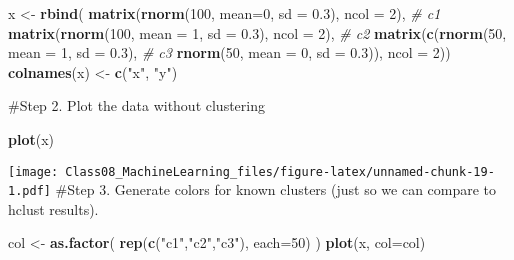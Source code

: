 \documentclass[]{article}
\newenvironment{Shaded}{\begin{snugshade}}{\end{snugshade}}
\newcommand{\CommentTok}[1]{\textcolor[rgb]{0.56,0.35,0.01}{\textit{#1}}}
\newcommand{\DataTypeTok}[1]{\textcolor[rgb]{0.13,0.29,0.53}{#1}}
\newcommand{\DecValTok}[1]{\textcolor[rgb]{0.00,0.00,0.81}{#1}}
\newcommand{\FloatTok}[1]{\textcolor[rgb]{0.00,0.00,0.81}{#1}}
\newcommand{\KeywordTok}[1]{\textcolor[rgb]{0.13,0.29,0.53}{\textbf{#1}}}
\newcommand{\NormalTok}[1]{#1}
\newcommand{\StringTok}[1]{\textcolor[rgb]{0.31,0.60,0.02}{#1}}
\begin{document}
\begin{Shaded}
\begin{Highlighting}[]
\NormalTok{x <-}\StringTok{ }\KeywordTok{rbind}\NormalTok{(}
 \KeywordTok{matrix}\NormalTok{(}\KeywordTok{rnorm}\NormalTok{(}\DecValTok{100}\NormalTok{, }\DataTypeTok{mean=}\DecValTok{0}\NormalTok{, }\DataTypeTok{sd =} \FloatTok{0.3}\NormalTok{), }\DataTypeTok{ncol =} \DecValTok{2}\NormalTok{), }\CommentTok{# c1}
 \KeywordTok{matrix}\NormalTok{(}\KeywordTok{rnorm}\NormalTok{(}\DecValTok{100}\NormalTok{, }\DataTypeTok{mean =} \DecValTok{1}\NormalTok{, }\DataTypeTok{sd =} \FloatTok{0.3}\NormalTok{), }\DataTypeTok{ncol =} \DecValTok{2}\NormalTok{), }\CommentTok{# c2}
 \KeywordTok{matrix}\NormalTok{(}\KeywordTok{c}\NormalTok{(}\KeywordTok{rnorm}\NormalTok{(}\DecValTok{50}\NormalTok{, }\DataTypeTok{mean =} \DecValTok{1}\NormalTok{, }\DataTypeTok{sd =} \FloatTok{0.3}\NormalTok{), }\CommentTok{# c3}
 \KeywordTok{rnorm}\NormalTok{(}\DecValTok{50}\NormalTok{, }\DataTypeTok{mean =} \DecValTok{0}\NormalTok{, }\DataTypeTok{sd =} \FloatTok{0.3}\NormalTok{)), }\DataTypeTok{ncol =} \DecValTok{2}\NormalTok{))}
\KeywordTok{colnames}\NormalTok{(x) <-}\StringTok{ }\KeywordTok{c}\NormalTok{(}\StringTok{"x"}\NormalTok{, }\StringTok{"y"}\NormalTok{)}
\end{Highlighting}
\end{Shaded}

\#Step 2. Plot the data without clustering

\begin{Shaded}
\begin{Highlighting}[]
\KeywordTok{plot}\NormalTok{(x)}
\end{Highlighting}
\end{Shaded}

\texttt{[image: Class08\_MachineLearning\_files/figure-latex/unnamed-chunk-19-1.pdf]}
\#Step 3. Generate colors for known clusters (just so we can compare to
hclust results).

\begin{Shaded}
\begin{Highlighting}[]
\NormalTok{col <-}\StringTok{ }\KeywordTok{as.factor}\NormalTok{( }\KeywordTok{rep}\NormalTok{(}\KeywordTok{c}\NormalTok{(}\StringTok{"c1"}\NormalTok{,}\StringTok{"c2"}\NormalTok{,}\StringTok{"c3"}\NormalTok{), }\DataTypeTok{each=}\DecValTok{50}\NormalTok{) )}
\KeywordTok{plot}\NormalTok{(x, }\DataTypeTok{col=}\NormalTok{col)}
\end{Highlighting}
\end{Shaded}
\end{document}
